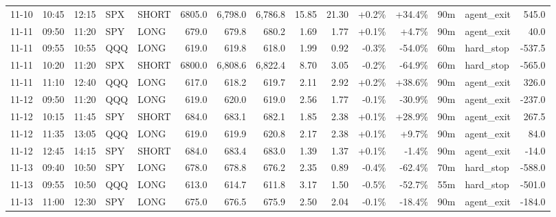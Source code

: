 \documentclass[11pt,a4paper,twoside]{article}
\begin{document}
\begin{landscape}
\begin{center}
\begin{longtable}{>{\color{txtmain}}l l l l l r r r r r r r r >{\color{txtmain}}l r}
11-10 & 10:45 & 12:15 & SPX & SHORT & 6805.0 & 6,798.0 & 6,786.8 & 15.85 & 21.30 & \textcolor{wingreen}{+0.2\%} & \textcolor{wingreen}{+34.4\%} & 90m & agent\_exit & \textcolor{wingreen}{545.0} \\
11-11 & 09:50 & 11:20 & SPY & LONG & 679.0 & 679.8 & 680.2 & 1.69 & 1.77 & \textcolor{wingreen}{+0.1\%} & \textcolor{wingreen}{+4.7\%} & 90m & agent\_exit & \textcolor{wingreen}{40.0} \\
11-11 & 09:55 & 10:55 & QQQ & LONG & 619.0 & 619.8 & 618.0 & 1.99 & 0.92 & \textcolor{lossred}{-0.3\%} & \textcolor{lossred}{-54.0\%} & 60m & hard\_stop & \textcolor{lossred}{-537.5} \\
11-11 & 10:20 & 11:20 & SPX & SHORT & 6800.0 & 6,808.6 & 6,822.4 & 8.70 & 3.05 & \textcolor{lossred}{-0.2\%} & \textcolor{lossred}{-64.9\%} & 60m & hard\_stop & \textcolor{lossred}{-565.0} \\
11-11 & 11:10 & 12:40 & QQQ & LONG & 617.0 & 618.2 & 619.7 & 2.11 & 2.92 & \textcolor{wingreen}{+0.2\%} & \textcolor{wingreen}{+38.6\%} & 90m & agent\_exit & \textcolor{wingreen}{326.0} \\
11-12 & 09:50 & 11:20 & QQQ & LONG & 619.0 & 620.0 & 619.0 & 2.56 & 1.77 & \textcolor{lossred}{-0.1\%} & \textcolor{lossred}{-30.9\%} & 90m & agent\_exit & \textcolor{lossred}{-237.0} \\
11-12 & 10:15 & 11:45 & SPY & SHORT & 684.0 & 683.1 & 682.1 & 1.85 & 2.38 & \textcolor{wingreen}{+0.1\%} & \textcolor{wingreen}{+28.9\%} & 90m & agent\_exit & \textcolor{wingreen}{267.5} \\
11-12 & 11:35 & 13:05 & QQQ & LONG & 619.0 & 619.9 & 620.8 & 2.17 & 2.38 & \textcolor{wingreen}{+0.1\%} & \textcolor{wingreen}{+9.7\%} & 90m & agent\_exit & \textcolor{wingreen}{84.0} \\
11-12 & 12:45 & 14:15 & SPY & SHORT & 684.0 & 683.4 & 683.0 & 1.39 & 1.37 & \textcolor{wingreen}{+0.1\%} & \textcolor{lossred}{-1.4\%} & 90m & agent\_exit & \textcolor{lossred}{-14.0} \\
11-13 & 09:40 & 10:50 & SPY & LONG & 678.0 & 678.8 & 676.2 & 2.35 & 0.89 & \textcolor{lossred}{-0.4\%} & \textcolor{lossred}{-62.4\%} & 70m & hard\_stop & \textcolor{lossred}{-588.0} \\
11-13 & 09:55 & 10:50 & QQQ & LONG & 613.0 & 614.7 & 611.8 & 3.17 & 1.50 & \textcolor{lossred}{-0.5\%} & \textcolor{lossred}{-52.7\%} & 55m & hard\_stop & \textcolor{lossred}{-501.0} \\
11-13 & 11:00 & 12:30 & SPY & LONG & 675.0 & 676.5 & 675.9 & 2.50 & 2.04 & \textcolor{lossred}{-0.1\%} & \textcolor{lossred}{-18.4\%} & 90m & agent\_exit & \textcolor{lossred}{-184.0} \\

\end{longtable}
\end{center}
\end{landscape}
\end{document}

